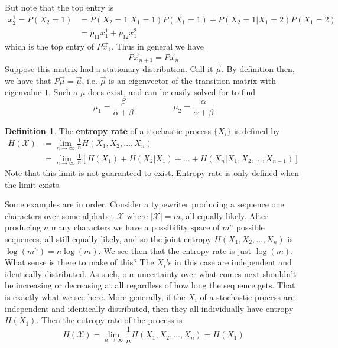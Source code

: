 \documentclass{article}
\theoremstyle{definition}
\newtheorem{definition}{Definition}[section]
\theoremstyle{plain}
\begin{document}
But note that the top entry is 
\begin{align}
	x_2^1 = P(X_2 = 1) &= P(X_2 = 1|X_1 = 1)P(X_1 = 1) + P(X_2 = 1|X_1 = 2)P(X_1 = 2) \\
			&= p_{11}x_1^1 + p_{12}x_1^2
\end{align} 
which is the top entry of $P\vec{x}_1$. Thus in general we have 
\[ P\vec{x}_{n+1} = P\vec{x}_n \]
Suppose this matrix had a stationary distribution. Call it $\vec{\mu}$. By definition then, we have that $P\vec{\mu} = \vec{\mu}$, i.e. $\vec{\mu}$ is an eigenvector of the transition matrix with eigenvalue $1$. Such a $\mu$ does exist, and can be easily solved for to find 
\[  \mu_1 = \frac{\beta}{\alpha + \beta} \hspace{2cm} \mu_2 = \frac{\alpha}{\alpha+\beta} \]
\begin{definition}
	The \textbf{entropy rate} of a stochastic process $\{X_i\}$ is defined by 
	\begin{align}
		H(\mathcal{X}) &= \lim_{n\to \infty} \frac{1}{n}H(X_1,X_2,\ldots,X_n) \\
					&= \lim_{n\to \infty} \frac{1}{n}\left[ H(X_1) + H(X_2|X_1) + \ldots + H(X_n|X_1,X_2,\ldots,X_{n-1}) \right]
	\end{align}
	Note that this limit is not guaranteed to exist. Entropy rate is only defined when the limit exists. 
\end{definition}
Some examples are in order. Consider a typewriter producing a sequence one characters over some alphabet $\mathcal{X}$ where $|\mathcal{X}| = m$, all equally likely. After producing $n$ many characters we have a possibility space of $m^n$ possible sequences, all still equally likely, and so the joint entropy $H(X_1,X_2,\ldots,X_n)$ is $\log(m^n) = n\log(m)$. We see then that the entropy rate is just $\log(m)$. What sense is there to make of this? The $X_i$'s in this case are independent and identically distributed. As such, our uncertainty over what comes next shouldn't be increasing or decreasing at all regardless of how long the sequence gets. That is exactly what we see here. More generally, if the $X_i$ of a stochastic process are independent and identically distributed, then they all individually have entropy $H(X_1)$. Then the entropy rate of the process is 
\[ H(\mathcal{X})  = \lim_{n \to \infty}\frac{1}{n}H(X_1,X_2,\ldots,X_n) = H(X_1) \]
\end{document}
